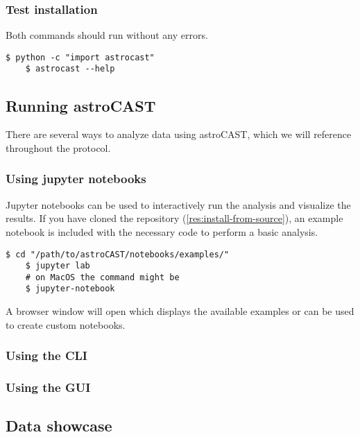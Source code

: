 \subsubsection{Test installation}

Both commands should run without any errors.

\begin{lstlisting}[style=bashStyle]
    $ python -c "import astrocast"
    $ astrocast --help
\end{lstlisting}

\subsection{Running astroCAST}

There are several ways to analyze data using \ac{astroCAST}, which we will reference throughout the protocol.

\subsubsection{Using jupyter notebooks}

Jupyter notebooks can be used to interactively run the analysis and visualize the results.
If you have cloned the repository (\ref{res:install-from-source}), an example notebook is included with the necessary
code to perform a basic analysis.

\begin{lstlisting}[style=bashStyle]
    $ cd "/path/to/astroCAST/notebooks/examples/"
    $ jupyter lab
    # on MacOS the command might be
    $ jupyter-notebook
\end{lstlisting}

A browser window will open which displays the available examples or can be used to create custom notebooks.

\subsubsection{Using the \ac{CLI}}

\subsubsection{Using the \ac{GUI}}

\subsection{Data showcase}

